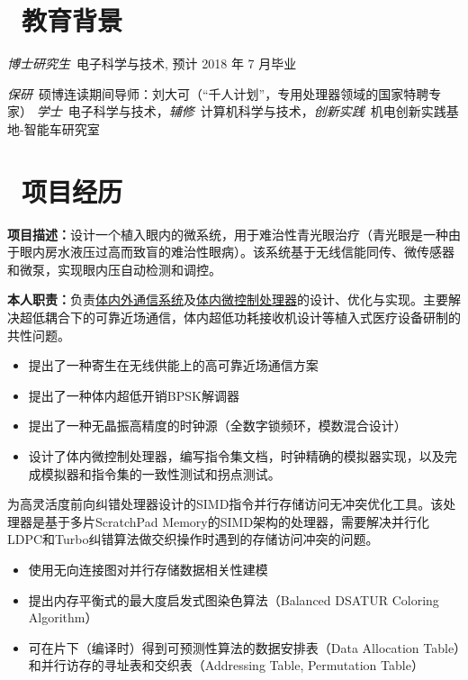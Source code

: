 \documentclass{resume}
\begin{document}



\section{\faGraduationCap\  教育背景}
\textit{博士研究生}\ 电子科学与技术, 预计 2018 年 7 月毕业

\textit{保研}\ 硕博连读期间导师：刘大可（“千人计划”，专用处理器领域的国家特聘专家）
\textit{学士}\ 电子科学与技术，\textit{辅修}\ 计算机科学与技术，\textit{创新实践}\ 机电创新实践基地-智能车研究室

\section{\faUsers\ 项目经历}
\textbf{项目描述：}设计一个植入眼内的微系统，用于难治性青光眼治疗（青光眼是一种由于眼内房水液压过高而致盲的难治性眼病）。该系统基于无线信能同传、微传感器和微泵，实现眼内压自动检测和调控。

\textbf{本人职责：}负责\underline{体内外通信系统}及\underline{体内微控制处理器}的设计、优化与实现。主要解决超低耦合下的可靠近场通信，体内超低功耗接收机设计等植入式医疗设备研制的共性问题。
\begin{itemize}
  \item 提出了一种寄生在无线供能上的高可靠近场通信方案
  \item 提出了一种体内超低开销BPSK解调器
  \item 提出了一种无晶振高精度的时钟源（全数字锁频环，模数混合设计）
  \item 设计了体内微控制处理器，编写指令集文档，时钟精确的模拟器实现，以及完成模拟器和指令集的一致性测试和拐点测试。
\end{itemize}

为高灵活度前向纠错处理器设计的SIMD指令并行存储访问无冲突优化工具。该处理器是基于多片ScratchPad Memory的SIMD架构的处理器，需要解决并行化LDPC和Turbo纠错算法做交织操作时遇到的存储访问冲突的问题。
\begin{itemize}
  \item 使用无向连接图对并行存储数据相关性建模
  \item 提出内存平衡式的最大度启发式图染色算法（Balanced DSATUR Coloring Algorithm）
  \item 可在片下（编译时）得到可预测性算法的数据安排表（Data Allocation Table）和并行访存的寻址表和交织表（Addressing Table, Permutation Table）
\end{itemize}
\end{document}
